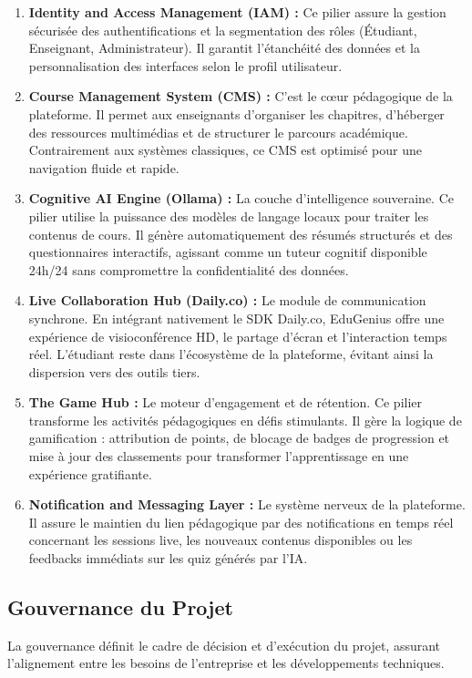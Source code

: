 \begin{enumerate}
\item \textbf{Identity and Access Management (IAM) :} Ce pilier assure la gestion sécurisée des authentifications et la segmentation des rôles (Étudiant, Enseignant, Administrateur). Il garantit l'étanchéité des données et la personnalisation des interfaces selon le profil utilisateur.
\item \textbf{Course Management System (CMS) :} C'est le cœur pédagogique de la plateforme. Il permet aux enseignants d'organiser les chapitres, d'héberger des ressources multimédias et de structurer le parcours académique. Contrairement aux systèmes classiques, ce CMS est optimisé pour une navigation fluide et rapide.
\item \textbf{Cognitive AI Engine (Ollama) :} La couche d'intelligence souveraine. Ce pilier utilise la puissance des modèles de langage locaux pour traiter les contenus de cours. Il génère automatiquement des résumés structurés et des questionnaires interactifs, agissant comme un tuteur cognitif disponible 24h/24 sans compromettre la confidentialité des données.
\item \textbf{Live Collaboration Hub (Daily.co) :} Le module de communication synchrone. En intégrant nativement le SDK Daily.co, EduGenius offre une expérience de visioconférence HD, le partage d'écran et l'interaction temps réel. L'étudiant reste dans l'écosystème de la plateforme, évitant ainsi la dispersion vers des outils tiers.
\item \textbf{The Game Hub :} Le moteur d'engagement et de rétention. Ce pilier transforme les activités pédagogiques en défis stimulants. Il gère la logique de gamification : attribution de points, de blocage de badges de progression et mise à jour des classements pour transformer l'apprentissage en une expérience gratifiante.
\item \textbf{Notification and Messaging Layer :} Le système nerveux de la plateforme. Il assure le maintien du lien pédagogique par des notifications en temps réel concernant les sessions live, les nouveaux contenus disponibles ou les feedbacks immédiats sur les quiz générés par l'IA.
\end{enumerate}

\subsection{Gouvernance du Projet}

La gouvernance définit le cadre de décision et d'exécution du projet, assurant l'alignement entre les besoins de l'entreprise et les développements techniques.

